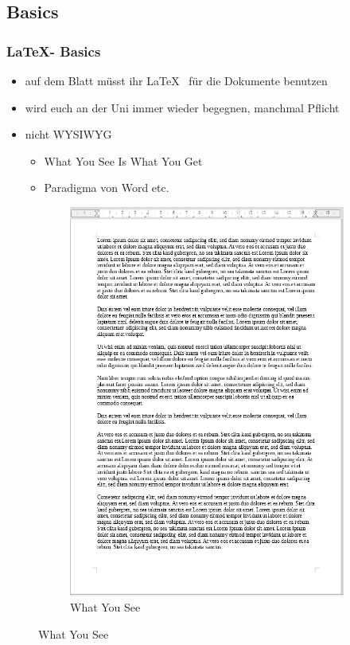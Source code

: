\documentclass[18pt]{beamer}
\begin{document}
	\subsection{Basics}
	\begin{frame}
		\frametitle{\LaTeX - Basics}
		\begin{itemize}
			\item auf dem Blatt müsst ihr \LaTeX  ~ für die Dokumente benutzen
			\item wird euch an der Uni immer wieder begegnen, manchmal Pflicht
			\pause
			\item nicht WYSIWYG
			\begin{itemize}
				\item What You See Is What You Get
				\item Paradigma von Word etc.
			\end{itemize}
		\end{itemize}
		\begin{figure}
			\begin{subfigure}{0.5\textwidth}
				\centering
				\caption{\small What You See}
				\includegraphics[scale=0.2]{pics/tut1/wysiwyg_raw.png}

\end{subfigure}
\end{figure}
\end{frame}
\end{document}
